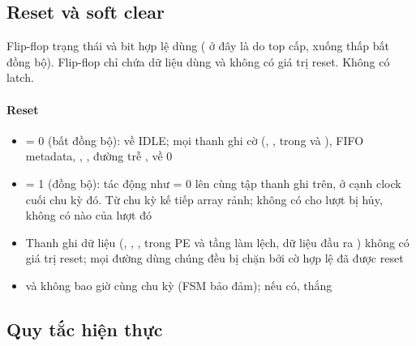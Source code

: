 \documentclass[10pt,a4paper]{article}
\begin{document}
\subsection{Reset và soft clear}\label{sec:7}

\begin{notebox}
Flip-flop trạng thái và bit hợp lệ dùng  ( ở đây là  do top cấp, xuống thấp bất đồng bộ). Flip-flop chỉ chứa dữ liệu dùng  và không có giá trị reset. Không có latch.
\end{notebox}

\paragraph{Reset}\label{par:7-1}
\begin{itemize}
\item {} = 0 (bất đồng bộ):  về IDLE; mọi thanh ghi cờ (, ,  trong  và ), FIFO metadata, , , đường trễ ,  về 0
\item {} = 1 (đồng bộ): tác động như  = 0 lên cùng tập thanh ghi trên, ở cạnh clock cuối chu kỳ đó. Từ chu kỳ kế tiếp array rảnh; không có  cho lượt bị hủy, không có  nào của lượt đó
\item Thanh ghi dữ liệu (, , ,  trong PE và tầng làm lệch, dữ liệu đầu ra ) không có giá trị reset; mọi đường dùng chúng đều bị chặn bởi cờ hợp lệ đã được reset
\item {} và  không bao giờ cùng chu kỳ (FSM bảo đảm); nếu có,  thắng
\end{itemize}

\subsection{Quy tắc hiện thực}\label{sec:8}
\end{document}
